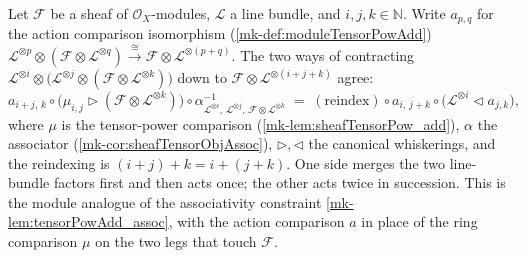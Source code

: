 \begin{lemma}\label{mk-lem:moduleTensorPowAdd_assoc}
  \leanok

  Let \(\mathcal{F}\) be a sheaf of \(\mathcal{O}_X\)-modules, \(\mathcal{L}\) a line
  bundle, and \(i, j, k \in \mathbb{N}\). Write \(a_{p,q}\) for the action comparison
  isomorphism (\ref{mk-def:moduleTensorPowAdd})
  \(\mathcal{L}^{\otimes p}\otimes(\mathcal{F}\otimes\mathcal{L}^{\otimes q})
  \xrightarrow{\cong}\mathcal{F}\otimes\mathcal{L}^{\otimes(p+q)}\). The two ways of
  contracting
  \(\mathcal{L}^{\otimes i}\otimes\bigl(\mathcal{L}^{\otimes j}\otimes
  (\mathcal{F}\otimes\mathcal{L}^{\otimes k})\bigr)\) down to
  \(\mathcal{F}\otimes\mathcal{L}^{\otimes(i+j+k)}\) agree:
  \[
    a_{i+j,\,k}\circ\bigl(\mu_{i,j}\rhd(\mathcal{F}\otimes\mathcal{L}^{\otimes k})\bigr)
      \circ \alpha^{-1}_{\mathcal{L}^{\otimes i},\,\mathcal{L}^{\otimes j},\,
        \mathcal{F}\otimes\mathcal{L}^{\otimes k}}
    \;=\;
    \mathrm{(reindex)}\circ a_{i,\,j+k}\circ
      \bigl(\mathcal{L}^{\otimes i}\lhd a_{j,k}\bigr),
  \]
  where \(\mu\) is the tensor-power comparison (\ref{mk-lem:sheafTensorPow_add}),
  \(\alpha\) the associator (\ref{mk-cor:sheafTensorObjAssoc}), \(\rhd, \lhd\) the
  canonical whiskerings, and the reindexing is \((i+j)+k = i+(j+k)\). One side merges
  the two line-bundle factors first and then acts once; the other acts twice in
  succession. This is the module analogue of the associativity constraint
  \ref{mk-lem:tensorPowAdd_assoc}, with the action comparison \(a\) in place of the
  ring comparison \(\mu\) on the two legs that touch \(\mathcal{F}\).
\end{lemma}

